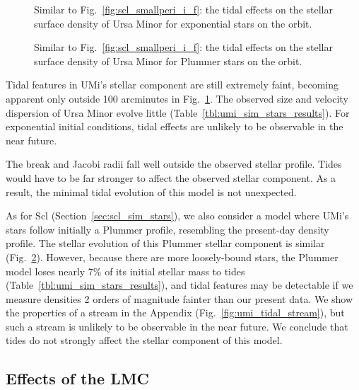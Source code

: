 \begin{figure}
\centering
{}
\caption[Ursa Minor simulated density profiles]{Similar to
Fig.~\ref{fig:scl_smallperi_i_f}: the tidal effects on the stellar
surface density of Ursa Minor for exponential stars on the \smallperi{}
orbit.}\label{fig:umi_smallperi_i_f}
\end{figure}

\begin{figure}
\centering
{}
\caption[Ursa Minor Plummer model density]{Similar to
Fig.~\ref{fig:scl_smallperi_i_f}: the tidal effects on the stellar
surface density of Ursa Minor for Plummer stars on the \smallperi{}
orbit.}\label{fig:umi_plummer_i_f}
\end{figure}

Tidal features in UMi's stellar component are still extremely faint,
becoming apparent only outside 100 arcminutes in
Fig.~\ref{fig:umi_smallperi_i_f}. The observed size and velocity
dispersion of Ursa Minor evolve little
(Table~\ref{tbl:umi_sim_stars_results}). For exponential initial
conditions, tidal effects are unlikely to be observable in the near
future.

The break and Jacobi radii fall well outside the observed stellar
profile. Tides would have to be far stronger to affect the observed
stellar component. As a result, the minimal tidal evolution of this
model is not unexpected.

As for Scl (Section~\ref{sec:scl_sim_stars}), we also consider a model
where UMi's stars follow initially a Plummer profile, resembling the
present-day density profile. The stellar evolution of this Plummer
stellar component is similar (Fig.~\ref{fig:umi_plummer_i_f}). However,
because there are more loosely-bound stars, the Plummer model loses
nearly 7\% of its initial stellar mass to tides
(Table~\ref{tbl:umi_sim_stars_results}), and tidal features may be
detectable if we measure densities 2 orders of magnitude fainter than
our present data. We show the properties of a stream in the Appendix
(Fig.~\ref{fig:umi_tidal_stream}), but such a stream is unlikely to be
observable in the near future. We conclude that tides do not strongly
affect the stellar component of this model.

\subsection{Effects of the LMC}\label{effects-of-the-lmc}

